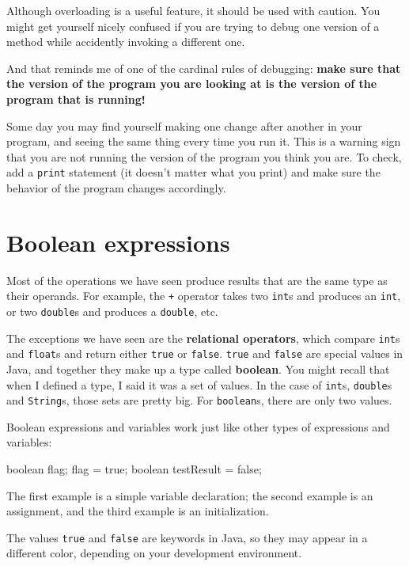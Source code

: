 Although overloading is a useful feature, it should be used
with caution.  You might get yourself nicely confused if you
are trying to debug one version of a method while accidently
invoking a different one.

And that reminds me of one of the cardinal rules of
debugging: {\bf make sure that the version of the program
you are looking at is the version of the program that is running!}

Some day you may find yourself making one change after another
in your program, and seeing the same thing every time you run it.
This is a warning sign that you are
not running the version of the program you think you are.  To
check, add a {\tt print} statement (it doesn't matter what
you print) and make sure the behavior of the program changes
accordingly.


\section{Boolean expressions}

Most of the operations we have seen produce results that are
the same type as their operands.  For example, the {\tt +} operator
takes two {\tt int}s and produces an {\tt int}, or two {\tt double}s
and produces a {\tt double}, etc.


The exceptions we have seen are the {\bf relational operators}, which
compare {\tt int}s and {\tt float}s and return either {\tt true} or
{\tt false}.  {\tt true} and {\tt false} are special values in Java,
and together they make up a type called {\bf boolean}.  You might
recall that when I defined a type, I said it was a set of values.  In
the case of {\tt int}s, {\tt double}s and {\tt String}s, those sets
are pretty big.  For {\tt boolean}s, there are only two values.

Boolean expressions and variables work just like other types of
expressions and variables:

\begin{code}
    boolean flag;
    flag = true;
    boolean testResult = false;
\end{code}

The first example is a simple variable declaration;
the second example is an assignment, and the third example is an
initialization.

The values {\tt true} and {\tt false}
are keywords in Java, so they may appear in a different color,
depending on your development environment.

